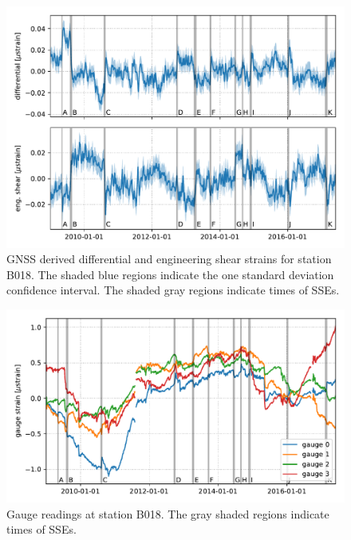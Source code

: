 \documentclass[10pt,a4paper]{article}
\begin{document}
\begin{figure}
\includegraphics{figures/gnss.pdf}
\caption{GNSS derived differential and engineering shear strains for station B018. The shaded blue regions indicate the one standard deviation confidence interval. The shaded gray regions indicate times of SSEs.}   
\label{fig:Gnss}
\end{figure}

\begin{figure}
\includegraphics{figures/gauge.pdf}
\caption{Gauge readings at station B018. The gray shaded regions indicate times of SSEs.}   
\label{fig:Gauge}
\end{figure}
\end{document}
